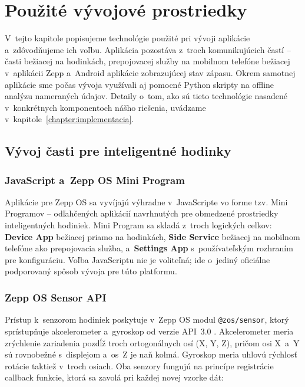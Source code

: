 \section{Použité vývojové prostriedky}
\label{chapter:vyvojove-prostriedky}

V~tejto kapitole popisujeme technológie použité pri
vývoji aplikácie a~zdôvodňujeme ich voľbu. Aplikácia
pozostáva z~troch komunikujúcich častí -- časti
bežiacej na hodinkách, prepojovacej služby na
mobilnom telefóne bežiacej v~aplikácii Zepp
a~Android aplikácie zobrazujúcej stav zápasu. Okrem
samotnej aplikácie sme počas vývoja využívali aj
pomocné Python skripty na offline analýzu nameraných
údajov. Detaily o~tom, ako sú tieto technológie
nasadené v~konkrétnych komponentoch nášho riešenia,
uvádzame v~kapitole~\ref{chapter:implementacia}.

\subsection{Vývoj časti pre inteligentné hodinky}
\label{subsec:hodinky-tech}

\subsubsection{JavaScript a~Zepp OS Mini Program}

Aplikácie pre Zepp OS \cite{zepp_architecture} sa vyvíjajú výhradne
v~JavaScripte vo forme tzv. Mini Programov --
odľahčených aplikácií navrhnutých pre obmedzené
prostriedky inteligentných hodiniek. Mini Program
sa skladá z~troch logických celkov: \textbf{Device App}
bežiacej priamo na hodinkách, \textbf{Side Service}
bežiacej na mobilnom telefóne ako prepojovacia služba,
a~\textbf{Settings App} s~používateľským rozhraním
pre konfiguráciu. Voľba JavaScriptu nie je voliteľná;
ide o~jediný oficiálne podporovaný spôsob vývoja
pre túto platformu.

\subsubsection{Zepp OS Sensor API}

Prístup k~senzorom hodiniek poskytuje v~Zepp OS
modul \texttt{@zos/sensor}, ktorý sprístupňuje
akcelerometer a~gyroskop od verzie API~3.0
\cite{zepp_sensor_acc, zepp_sensor_gyro}.
Akcelerometer meria zrýchlenie zariadenia pozdĺž
troch ortogonálnych osí (X, Y, Z), pričom osi
X~a~Y sú rovnobežné s~displejom a~os~Z je naň
kolmá. Gyroskop meria uhlovú rýchlosť rotácie
taktiež v~troch osiach. Oba senzory fungujú
na princípe registrácie callback funkcie, ktorá
sa zavolá pri každej novej vzorke dát:

